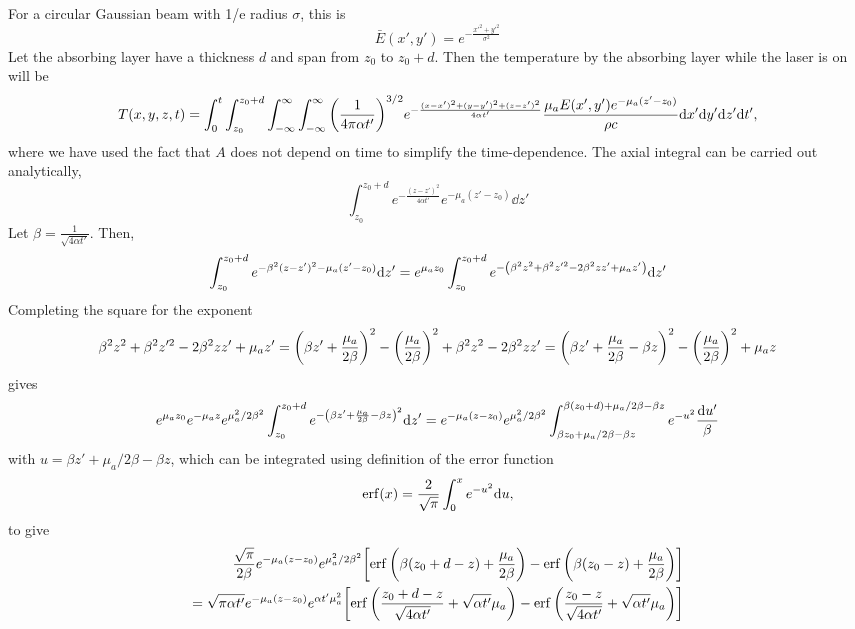 \documentclass[]{article}
\begin{document}
For a circular Gaussian beam with 1/e radius $\sigma$, this is 
\begin{equation*}
    \bar{E}(x',y') = e^{-\frac{x'^2 + y'^2}{\sigma^2}}
\end{equation*}
Let the absorbing layer have a thickness $d$ and span from $z_0$ to $z_0 + d$. Then the temperature
by the absorbing layer while the laser is on will be
\begin{equation*}
  T(x,y,z,t) = \int_0^t \int_{z_0}^{z_0 + d} \int_{-\infty}^{\infty} \int_{-\infty}^{\infty} \qty(\frac{1}{4\pi \alpha t'})^{3/2} e^{-\frac{(x-x')^2+(y-y')^2+(z-z')^2}{4\alpha t'}} \frac{\mu_a E(x',y') e^{-\mu_a (z'-z_0)}}{\rho c} \dd x' \dd y' \dd z' \dd t',
\end{equation*}
where we have used the fact that $A$ does not depend on time to simplify the time-dependence.
The axial integral can be carried out analytically,
\begin{equation*}
    \int_{z_0}^{z_0 + d} e^{-\frac{(z-z')^2}{4\alpha t'}} e^{-\mu_a (z'-z_0)} \dd z'
\end{equation*}
Let $\beta = \frac{1}{\sqrt{4 \alpha t'}}$. Then,
\begin{equation*}
    \int_{z_0}^{z_0 + d} e^{-\beta^2 (z-z')^2-\mu_a (z'-z_0)} \dd z' =
   e^{\mu_a z_0} \int_{z_0}^{z_0 + d} e^{-\qty(\beta^2 z^2 + \beta^2z'^2 -2\beta^2zz'+\mu_a z')} \dd z'
\end{equation*}
Completing the square for the exponent
\begin{equation*}
  \beta^2 z^2 + \beta^2 z'^2 -2\beta^2 z z' + \mu_a z' = \qty(\beta z' + \frac{\mu_a}{2\beta})^2 - \qty(\frac{\mu_a}{2\beta})^2 + \beta^2z^2 - 2\beta^2 z z'= \qty(\beta z' + \frac{\mu_a}{2\beta} - \beta z)^2 - \qty(\frac{\mu_a}{2\beta})^2  + \mu_a z
\end{equation*}
gives
\begin{align*}
  e^{\mu_a z_0}e^{-\mu_a z} e^{\mu_a^2/2\beta^2}\int_{z_0}^{z_0 + d} e^{-\qty(\beta z' + \frac{\mu_a}{2\beta} - \beta z)^2} \dd z'
= e^{-\mu_a (z-z_0)} e^{\mu_a^2/2\beta^2}\int_{\beta z_0 + \mu_a/2\beta - \beta z}^{\beta(z_0 + d) + \mu_a/2\beta - \beta z} e^{-u^2} \frac{\dd u'}{\beta}
\end{align*}
with $u = \beta z' + \mu_a/2\beta - \beta z$, which can be integrated using definition of the error function
\begin{equation*}
  \erf(x) = \frac{2}{\sqrt{\pi}} \int_0^x e^{-u^2} \dd u,
\end{equation*}
to give
\begin{align*}
  \frac{\sqrt{\pi}}{2\beta} e^{-\mu_a (z-z_0)} e^{\mu_a^2/2\beta^2}\qty[\erf\qty(\beta(z_0 + d - z) + \frac{\mu_a}{2\beta} ) - \erf\qty(\beta(z_0 - z) + \frac{\mu_a}{2\beta}) ] \\
  = \sqrt{\pi\alpha t'} e^{-\mu_a (z-z_0)} e^{\alpha t'\mu_a^2}\qty[\erf\qty(\frac{z_0 + d - z}{\sqrt{4\alpha t'}} + \sqrt{\alpha t'}\mu_a ) - \erf\qty(\frac{z_0 - z}{\sqrt{4\alpha t'}} + \sqrt{\alpha t'}\mu_a ) ]
\end{align*}
\end{document}
